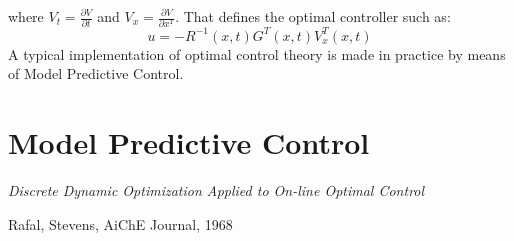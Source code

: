 where $V_t=\frac{\partial V}{\partial t}$ and $V_x=\frac{\partial V}{\partial x^T}$. That defines the optimal controller such as:
\begin{equation}
	u=-R^{-1}(x,t)G^T(x,t)V_x^T(x,t) 
\end{equation}
A typical implementation of optimal control theory is made in practice by means of Model Predictive Control. 

\section{Model Predictive Control}
\label{section_MPC}

\epigraph{\textit{Discrete Dynamic Optimization Applied to On-line Optimal Control}}{\begin{scriptsize}
Rafal, Stevens, AiChE Journal, 1968
\end{scriptsize}}

